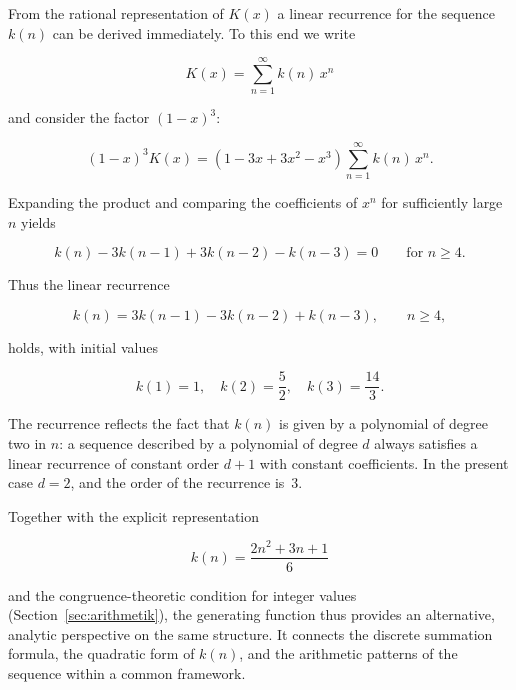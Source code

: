 From the rational representation of $K(x)$ a linear recurrence for the
sequence $k(n)$ can be derived immediately. To this end we write


\[
  K(x) = \sum_{n=1}^{\infty} k(n)\,x^{n}
\]


and consider the factor $(1-x)^{3}$:


\[
  (1-x)^{3} K(x)
  = (1 - 3x + 3x^{2} - x^{3}) \sum_{n=1}^{\infty} k(n)\,x^{n}.
\]


Expanding the product and comparing the coefficients of $x^{n}$ for
sufficiently large $n$ yields


\[
  k(n) - 3k(n-1) + 3k(n-2) - k(n-3) = 0 \qquad \text{for } n \ge 4.
\]


Thus the linear recurrence


\[
  k(n) = 3k(n-1) - 3k(n-2) + k(n-3), \qquad n \ge 4,
\]


holds, with initial values


\[
  k(1) = 1,\quad k(2) = \frac{5}{2},\quad k(3) = \frac{14}{3}.
\]



\begin{remark}
The recurrence reflects the fact that $k(n)$ is given by a polynomial of
degree two in $n$: a sequence described by a polynomial of degree $d$
always satisfies a linear recurrence of constant order $d+1$ with constant
coefficients. In the present case $d=2$, and the order of the recurrence
is~$3$.

Together with the explicit representation


\[
  k(n) = \frac{2n^{2} + 3n + 1}{6}
\]


and the congruence-theoretic condition for integer values
(Section~\ref{sec:arithmetik}), the generating function thus provides an
alternative, analytic perspective on the same structure. It connects the
discrete summation formula, the quadratic form of $k(n)$, and the
arithmetic patterns of the sequence within a common framework.
\end{remark}
